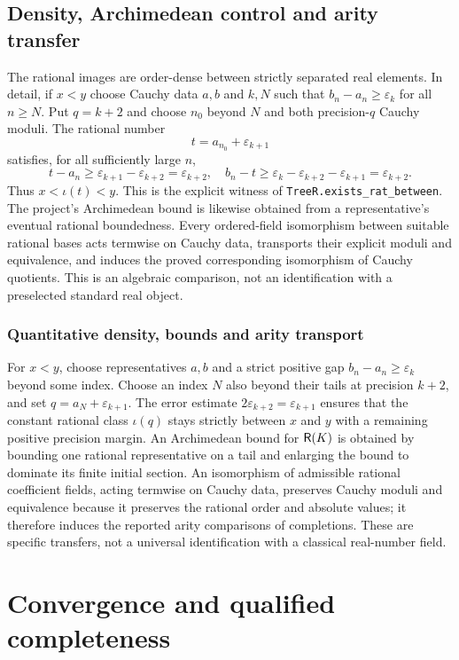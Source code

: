 \documentclass[11pt,reqno]{amsart}
\theoremstyle{definition}\newtheorem{definition}[theorem]{Definition}
\theoremstyle{remark}\newtheorem{remark}[theorem]{Remark}
\newcommand{\eps}{\varepsilon}
\begin{document}
\subsection{Density, Archimedean control and arity transfer}\label{main:sub-45}
The rational images are order-dense between strictly separated real elements. In detail, if $x<y$ choose Cauchy data $a,b$ and $k,N$ such that $b_n-a_n\ge\eps_k$ for all $n\ge N$. Put $q=k+2$ and choose $n_0$ beyond $N$ and both precision-$q$ Cauchy moduli. The rational number
\[
 t=a_{n_0}+\eps_{k+1}
\]
satisfies, for all sufficiently large $n$,
\[
 t-a_n\ge\eps_{k+1}-\eps_{k+2}=\eps_{k+2},
\quad
 b_n-t\ge\eps_k-\eps_{k+2}-\eps_{k+1}=\eps_{k+2}.
\]
Thus $x<\iota(t)<y$. This is the explicit witness of \texttt{TreeR.exists\_rat\_between}. The project's Archimedean bound is likewise obtained from a representative's eventual rational boundedness. Every ordered-field isomorphism between suitable rational bases acts termwise on Cauchy data, transports their explicit moduli and equivalence, and induces the proved corresponding isomorphism of Cauchy quotients. This is an algebraic comparison, not an identification with a preselected standard real object.


\medskip
\subsubsection*{Quantitative density, bounds and arity transport}\label{supp:12-7}
For $x<y$, choose representatives $a,b$ and a strict positive gap $b_n-a_n\ge\eps_k$ beyond some index. Choose an index $N$ also beyond their tails at precision $k+2$, and set $q=a_N+\eps_{k+1}$. The error estimate $2\eps_{k+2}=\eps_{k+1}$ ensures that the constant rational class $\iota(q)$ stays strictly between $x$ and $y$ with a remaining positive precision margin. An Archimedean bound for $\mathsf R(K)$ is obtained by bounding one rational representative on a tail and enlarging the bound to dominate its finite initial section. An isomorphism of admissible rational coefficient fields, acting termwise on Cauchy data, preserves Cauchy moduli and equivalence because it preserves the rational order and absolute values; it therefore induces the reported arity comparisons of completions. These are specific transfers, not a universal identification with a classical real-number field.
\medskip

\clearpage
\section{Convergence and qualified completeness}\label{sec:complete}
\end{document}
